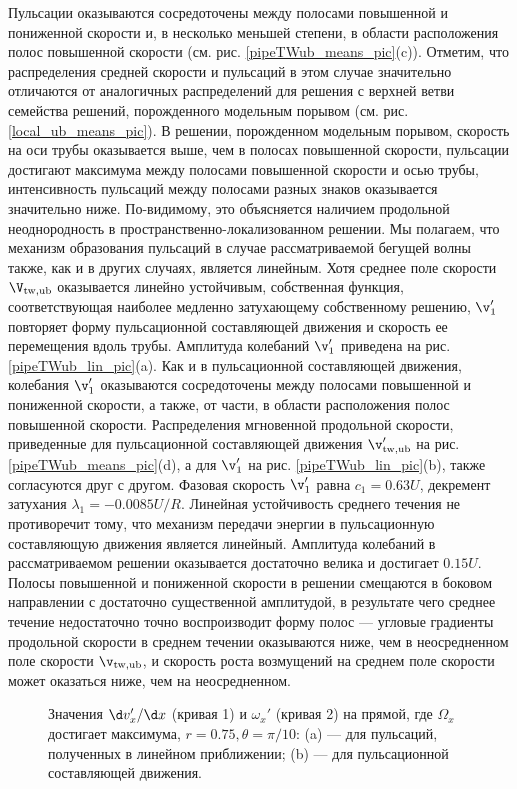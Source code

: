 Пульсации оказываются сосредоточены между полосами повышенной и пониженной скорости и, в несколько меньшей степени, в области расположения полос повышенной скорости (см. рис. \ref{pipeTWub_means_pic}(c)). Отметим, что распределения средней скорости и пульсаций в этом случае значительно отличаются от аналогичных распределений для решения с верхней ветви семейства решений, порожденного модельным порывом (см. рис. \ref{local_ub_means_pic}). В решении, порожденном модельным порывом, скорость на оси трубы оказывается выше, чем в полосах повышенной скорости, пульсации достигают максимума между полосами повышенной скорости и осью трубы, интенсивность пульсаций между полосами разных знаков оказывается значительно ниже. По-видимому, это объясняется наличием продольной неоднородность в пространственно-локализованном решении. Мы полагаем, что механизм образования пульсаций в случае рассматриваемой бегущей волны также, как и в других случаях, является линейным. Хотя среднее поле скорости $\V_\mathrm{tw,ub}$ оказывается линейно устойчивым, собственная функция, соответствующая наиболее медленно затухающему собственному решению, $\v'_1$ повторяет форму пульсационной составляющей движения и скорость ее перемещения вдоль трубы. Амплитуда колебаний $\v'_1$ приведена на рис. \ref{pipeTWub_lin_pic}(a). Как и в пульсационной составляющей движения, колебания $\v'_1$ оказываются сосредоточены между полосами повышенной и пониженной скорости, а также, от части, в области расположения полос повышенной скорости. Распределения мгновенной продольной скорости, приведенные для пульсационной составляющей движения $\v'_\mathrm{tw,ub}$ на рис. \ref{pipeTWub_means_pic}(d), а для $\v'_1$ на рис. \ref{pipeTWub_lin_pic}(b), также согласуются друг с другом. Фазовая скорость $\v'_1$ равна $c_1 = 0.63U$, декремент затухания $\lambda_1 = -0.0085U/R$. Линейная устойчивость среднего течения не противоречит тому, что механизм передачи энергии в пульсационную составляющую движения является линейный. Амплитуда колебаний в рассматриваемом решении оказывается достаточно велика и достигает $0.15U$. Полосы повышенной и пониженной скорости в решении смещаются в боковом направлении с достаточно существенной амплитудой, в результате чего среднее течение недостаточно точно воспроизводит форму полос --- угловые градиенты продольной скорости в среднем течении оказываются ниже, чем в неосредненном поле скорости $\v_\mathrm{tw,ub}$, и скорость роста возмущений на среднем поле скорости может оказаться ниже, чем на неосредненном.

\begin{figure}
\caption{Значения $\d v_x' /\d x$ (кривая 1) и $\omega_x'$ (кривая 2) на прямой, где $\Omega_x$ достигает максимума, $r = 0.75, \theta = \pi/10$: (a) --- для пульсаций, полученных в линейном приближении; (b) --- для пульсационной составляющей движения. }
\label{pipeTWub_corr_pic}
\end{figure}

